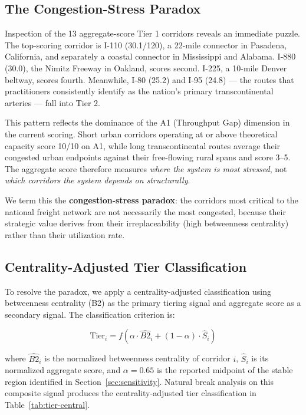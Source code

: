 \subsection{The Congestion-Stress Paradox}

Inspection of the 13 aggregate-score Tier 1 corridors reveals an immediate puzzle. The top-scoring corridor is I-110 (30.1/120), a 22-mile connector in Pasadena, California, and separately a coastal connector in Mississippi and Alabama. I-880 (30.0), the Nimitz Freeway in Oakland, scores second. I-225, a 10-mile Denver beltway, scores fourth. Meanwhile, I-80 (25.2) and I-95 (24.8) --- the routes that practitioners consistently identify as the nation's primary transcontinental arteries --- fall into Tier 2.

This pattern reflects the dominance of the A1 (Throughput Gap) dimension in the current scoring. Short urban corridors operating at or above theoretical capacity score 10/10 on A1, while long transcontinental routes average their congested urban endpoints against their free-flowing rural spans and score 3--5. The aggregate score therefore measures \textit{where the system is most stressed}, not \textit{which corridors the system depends on structurally}.

We term this the \textbf{congestion-stress paradox}: the corridors most critical to the national freight network are not necessarily the most congested, because their strategic value derives from their irreplaceability (high betweenness centrality) rather than their utilization rate.

\subsection{Centrality-Adjusted Tier Classification}

To resolve the paradox, we apply a centrality-adjusted classification using betweenness centrality (B2) as the primary tiering signal and aggregate score as a secondary signal. The classification criterion is:

\begin{equation}
\text{Tier}_i = f\left(\alpha \cdot \hat{B2}_i + (1 - \alpha) \cdot \hat{S}_i\right)
\label{eq:tier}
\end{equation}

where $\hat{B2}_i$ is the normalized betweenness centrality of corridor $i$, $\hat{S}_i$ is its normalized aggregate score, and $\alpha = 0.65$ is the reported midpoint of the stable region identified in Section~\ref{sec:sensitivity}. Natural break analysis on this composite signal produces the centrality-adjusted tier classification in Table~\ref{tab:tier-central}.

